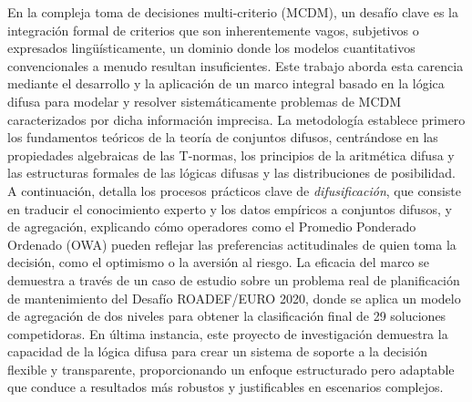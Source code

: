 \begin{poliabstract}[Resumen]
    En la compleja toma de decisiones multi-criterio (MCDM), un desafío clave es la integración formal de criterios que son inherentemente vagos, subjetivos o expresados lingüísticamente, un dominio donde los modelos cuantitativos convencionales a menudo resultan insuficientes. Este trabajo aborda esta carencia mediante el desarrollo y la aplicación de un marco integral basado en la lógica difusa para modelar y resolver sistemáticamente problemas de MCDM caracterizados por dicha información imprecisa. La metodología establece primero los fundamentos teóricos de la teoría de conjuntos difusos, centrándose en las propiedades algebraicas de las T-normas, los principios de la aritmética difusa y las estructuras formales de las lógicas difusas y las distribuciones de posibilidad. A continuación, detalla los procesos prácticos clave de \textit{difusificación}, que consiste en traducir el conocimiento experto y los datos empíricos a conjuntos difusos, y de agregación, explicando cómo operadores como el Promedio Ponderado Ordenado (OWA) pueden reflejar las preferencias actitudinales de quien toma la decisión, como el optimismo o la aversión al riesgo. La eficacia del marco se demuestra a través de un caso de estudio sobre un problema real de planificación de mantenimiento del Desafío ROADEF/EURO 2020, donde se aplica un modelo de agregación de dos niveles para obtener la clasificación final de 29 soluciones competidoras. En última instancia, este proyecto de investigación demuestra la capacidad de la lógica difusa para crear un sistema de soporte a la decisión flexible y transparente, proporcionando un enfoque estructurado pero adaptable que conduce a resultados más robustos y justificables en escenarios complejos.
\end{poliabstract}
    
